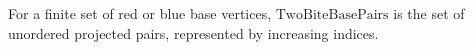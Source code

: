 \begin{definition}
For a finite set of red or blue base vertices, \(\mathrm{TwoBiteBasePairs}\) is
the set of unordered projected pairs, represented by increasing indices.
\end{definition}
